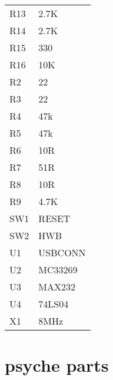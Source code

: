 \documentclass{article}
\begin{document}
\begin{center}
\begin{tabular}{ll}
 R13  &  2.7K        \\
 R14  &  2.7K        \\
 R15  &  330         \\
 R16  &  10K         \\
 R2   &  22          \\
 R3   &  22          \\
 R4   &  47k         \\
 R5   &  47k         \\
 R6   &  10R         \\
 R7   &  51R         \\
 R8   &  10R         \\
 R9   &  4.7K        \\
 SW1  &  RESET       \\
 SW2  &  HWB         \\
 U1   &  USBCONN     \\
 U2   &  MC33269     \\
 U3   &  MAX232      \\
 U4   &  74LS04      \\
 X1   &  8MHz        \\
\end{tabular}
\end{center}



\section*{psyche parts}
\label{sec-2}
\end{document}
